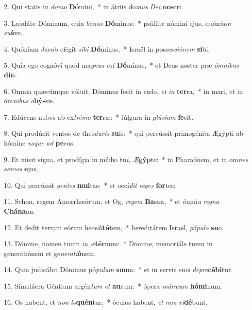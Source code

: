 2. Qui statis in \textit{do}\textit{mo} \textbf{Dó}mini,~*  in átriis do\textit{mus} \textit{De}\textit{i} \textbf{nos}tri.\

3. Laudáte Dóminum, quia \textit{bo}\textit{nus} \textbf{Dó}minus:~*  psállite nómini ejus, quón\textit{i}\textit{am} \textit{su}\textbf{á}ve.\

4. Quóniam Jacob elégit \textit{si}\textit{bi} \textbf{Dó}minus,~*  Israël in posses\textit{si}\textit{ó}\textit{nem} \textbf{si}bi.\

5. Quia ego cognóvi quod ma\textit{gnus} \textit{est} \textbf{Dó}minus,~*  et Deus noster præ \textit{óm}\textit{ni}\textit{bus} \textbf{di}is.\

6. Omnia quæcúmque vóluit, Dóminus fecit in cælo, \textit{et} \textit{in} \textbf{ter}ra,~*  in mari, et in óm\textit{ni}\textit{bus} \textit{a}\textbf{býs}sis.\

7. Edúcens nubes ab ex\textit{tré}\textit{mo} \textbf{ter}ræ:~*  fúlgura in \textit{plú}\textit{vi}\textit{am} \textbf{fe}cit.\

8. Qui prodúcit ventos de the\textit{sáu}\textit{ris} \textbf{su}is:~*  qui percússit primogénita Ægýpti ab hómine \textit{us}\textit{que} \textit{ad} \textbf{pe}cus.\

9. Et misit signa, et prodígia in médio tu\textit{i}, \textit{Æ}\textbf{gýp}te:~*  in Pharaónem, et in om\textit{nes} \textit{ser}\textit{vos} \textbf{e}jus.\

10. Qui percússit \textit{gen}\textit{tes} \textbf{mul}tas:~*  et occí\textit{dit} \textit{re}\textit{ges} \textbf{for}tes:\

11. Sehon, regem Amorrhæórum, et Og, \textit{re}\textit{gem} \textbf{Ba}san,~*  et ómni\textit{a} \textit{re}\textit{gna} \textbf{Chá}\textbf{na}an.\

12. Et dedit terram eórum he\textit{re}\textit{di}\textbf{tá}tem,~*  hereditátem Israël, \textit{pó}\textit{pu}\textit{lo} \textbf{su}o.\

13. Dómine, nomen tuum \textit{in} \textit{æ}\textbf{tér}num:~*  Dómine, memoriále tuum in generatiónem et ge\textit{ne}\textit{ra}\textit{ti}\textbf{ó}nem.\

14. Quia judicábit Dóminus pó\textit{pu}\textit{lum} \textbf{su}um:~*  et in servis su\textit{is} \textit{de}\textit{pre}\textbf{cá}\textbf{bi}tur.\

15. Simulácra Géntium argén\textit{tum} \textit{et} \textbf{au}rum:~*  ópera \textit{má}\textit{nu}\textit{um} \textbf{hó}\textbf{mi}num.\

16. Os habent, et \textit{non} \textit{lo}\textbf{quén}tur:~*  óculos habent, \textit{et} \textit{non} \textit{vi}\textbf{dé}bunt.\

